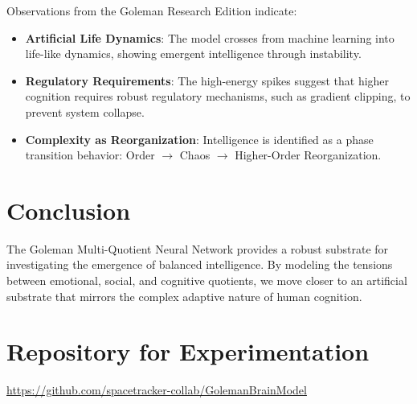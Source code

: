 \documentclass[12pt]{article}
\begin{document}
Observations from the Goleman Research Edition indicate:
\begin{itemize}
\item \textbf{Artificial Life Dynamics}: The model crosses from machine learning into life-like dynamics, showing emergent intelligence through instability.
\item \textbf{Regulatory Requirements}: The high-energy spikes suggest that higher cognition requires robust regulatory mechanisms, such as gradient clipping, to prevent system collapse.
\item \textbf{Complexity as Reorganization}: Intelligence is identified as a phase transition behavior: Order $\rightarrow$ Chaos $\rightarrow$ Higher-Order Reorganization.
\end{itemize}

\section{Conclusion}
The Goleman Multi-Quotient Neural Network provides a robust substrate for investigating the emergence of balanced intelligence. By modeling the tensions between emotional, social, and cognitive quotients, we move closer to an artificial substrate that mirrors the complex adaptive nature of human cognition.

\section{Repository for Experimentation}
\noindent
\url{https://github.com/spacetracker-collab/GolemanBrainModel}
\end{document}
